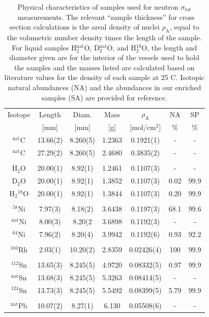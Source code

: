 \documentclass[twocolumn,secnumarabic,amssymb, nobibnotes, aps, prl,
superscriptaddress, nobalancelastpage, draft]{revtex4}
\newcommand{\tot}{\ensuremath{\sigma_{tot}}}
\begin{document}
\begin{table}[tb]
    \centering
    \begin{tabular}{c c c c c c c}
        \small Isotope & Length & Diam. & Mass & $\rho_{\text{A}}$ & NA & SP\\
        \small & [mm] & [mm] & [g] & [mol/cm$^{2}$] & \% & \%\\
        \hline
        $^{\text{nat}}$C& 13.66(2)& 8.260(5)& 1.2363& 0.1921(1)& -& -\\
        $^{\text{nat}}$C& 27.29(2)& 8.260(5)& 2.4680& 0.3835(2)& -& -\\
        \\
        H$_{2}$O& 20.00(1)& 8.92(1)& 1.2461& 0.1107(3)& -& - \\
        D$_{2}$O& 20.00(1)& 8.92(1)& 1.3852& 0.1107(3)& 0.02& 99.9\\
        H$_{2}$$^{18}$O& 20.00(1)& 8.92(1)& 1.3844& 0.1107(3)& 0.20& 99.9\\
        \\
        $^{58}$Ni& 7.97(3)& 8.18(2)& 3.6438& 0.1197(3)& 68.1& 99.6 \\
        $^{\text{nat}}$Ni& 8.00(3)& 8.20(2 & 3.6898& 0.1192(3)& - & -\\
        $^{64}$Ni& 7.96(2)& 8.20(4)& 3.9942& 0.1192(6)& 0.93& 92.2\\
        \\
        $^{103}$Rh& 2.03(1)& 10.20(2)& 2.8359& 0.02426(4)& 100& 99.9\\
        \\
        $^{112}$Sn& 13.65(3)& 8.245(5)& 4.9720& 0.08332(5)& 0.97& 99.9\\
        $^{\text{nat}}$Sn& 13.68(3)& 8.245(5)& 5.3263& 0.08414(5)& - & -\\
        $^{124}$Sn& 13.73(3)& 8.245(5)& 5.5492& 0.08399(5)& 5.79& 99.9\\
        \\
        $^{\text{nat}}$Pb& 10.07(2)& 8.27(1)& 6.130& 0.05508(6)& -& -\\
        \hline
    \end{tabular}
    \centering
    \caption{Physical characteristics of samples used for neutron \tot\ measurements.
The relevant ``sample thickness'' for cross section calculations is the areal density of nuclei
        $\rho_{\text{A}}$, equal to the volumetric number density times
        the length of the sample. For liquid
        samples H$_{2}^{\text{nat}}$O, D$_{2}^{\text{nat}}$O, and H$_{2}^{18}$O,
        the length and diameter given are for the interior of the vessels
        used to hold the samples and the masses listed are calculated based on 
        literature values for the density of each sample at 25 C. Isotopic natural abundances (NA) and
        the abundances in our enriched samples (SA) are provided for reference.}
    \label{SampleCharacteristics}
\end{table}
\end{document}

